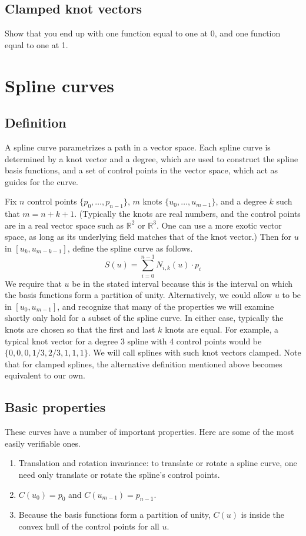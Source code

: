 \documentclass[11pt, oneside]{article}   	%
\begin{document}
\subsection{Clamped knot vectors}
Show that you end up with one function equal to one at 0, and one function equal to one at 1.


\section{Spline curves}
\subsection{Definition}
A spline curve parametrizes a path in a vector space. Each spline curve is determined by a knot vector and a degree, which are used to construct the spline basis functions, and a set of control points in the vector space, which act as guides for the curve. 

Fix $n$ control points $\{p_0, \ldots, p_{n-1}\}$, $m$ knots $\{u_0, \ldots, u_{m-1}\}$, and a degree $k$ such that $m = n + k + 1$. (Typically the knots are real numbers, and the control points are in a real vector space such as $\mathbb{R}^2$ or $\mathbb{R}^3$. One can use a more exotic vector space, as long as its underlying field matches that of the knot vector.) Then for $u$ in $[u_{k}, u_{m-k-1}]$, define the spline curve as follows.
\begin{equation}
S(u) = \sum_{i=0}^{n-1} N_{i, k} (u) \cdot p_i
\end{equation}
We require that $u$ be in the stated interval because this is the interval on which the basis functions form a partition of unity. Alternatively, we could allow $u$ to be in $[u_0, u_{m-1}]$, and recognize that many of the properties we will examine shortly only hold for a subset of the spline curve. In either case, typically the knots are chosen so that the first and last $k$ knots are equal. For example, a typical knot vector for a degree 3 spline with 4 control points would be $\{0, 0, 0, 1/3, 2/3, 1, 1, 1\}$. We will call splines with such knot vectors clamped. Note that for clamped splines, the alternative definition mentioned above becomes equivalent to our own.

\subsection{Basic properties}
These curves have a number of important properties. Here are some of the most easily verifiable ones.
\begin{enumerate}
\item Translation and rotation invariance: to translate or rotate a spline curve, one need only translate or rotate the spline's control points.
\item $C(u_0) = p_0$ and $C(u_{m-1}) = p_{n-1}$.
\item Because the basis functions form a partition of unity, $C(u)$ is inside the convex hull of the control points for all $u$.
\end{enumerate}
\end{document}
